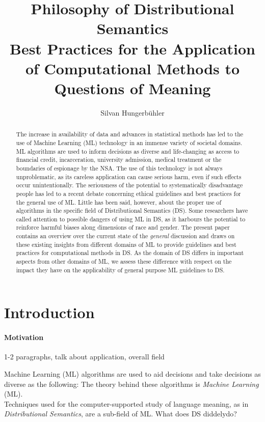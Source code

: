 \documentclass{article}
\title{Philosophy of Distributional Semantics\\
\large Best Practices for the Application of Computational Methods to Questions of Meaning}
\date{}
\author{Silvan Hungerb{\"u}hler}
\begin{document}
\maketitle
\begin{abstract}
The increase in availability of data and advances in statistical methods has led to the use of Machine Learning (ML) technology in an immense variety of societal domains. ML algorithms are used to inform decisions as diverse and life-changing as access to financial credit, incarceration, university admission, medical treatment or the boundaries of espionage by the NSA.
The use of this technology is not always unproblematic, as its careless application can cause serious harm, even if such effects occur unintentionally.
The seriousness of the potential to systematically disadvantage people has led to a recent debate concerning ethical guidelines and best practices for the general use of ML.
Little has been said, however, about the proper use of algorithms in the specific field of Distributional Semantics (DS). Some researchers have called attention to possible dangers of using ML in DS, as it harbours the potential to reinforce harmful biases along dimensions of race and gender.
The present paper contains an overview over the current state of the \emph{general} discussion 
and draws on these existing insights from different domains of ML to provide guidelines and best practices for computational methods in DS.
As the domain of DS differs in important aspects from other domains of ML, 
we assess these difference with respect on the impact they have on the applicability of general purpose ML guidelines to DS.
\end{abstract}
\section{Introduction}
\paragraph{Motivation}
1-2 paragraphs, talk about application, overall field

Machine Learning (ML) algorithms are used to aid decisions and take decisions as diverse as the following: %
The theory behind these algorithms is \emph{Machine Learning} (ML).\\

Techniques used for the computer-supported study of language meaning, as in \emph{Distributional Semantics}, are a sub-field of ML.
What does DS diddelydo?
\end{document}
